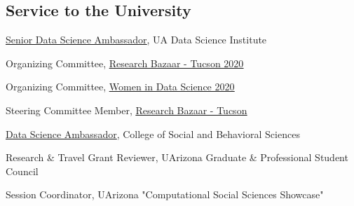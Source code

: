 \subsection*{Service to the University}

\href{https://datascience.arizona.edu/ambassadors}
{\underline{Senior Data Science Ambassador}}, UA Data Science Institute

Organizing Committee, 
\href{http://researchbazaar.arizona.edu/resbaz/resbazTucson2020/}
{\underline{Research Bazaar - Tucson 2020}} 

Organizing Committee, 
\href{https://datascience.arizona.edu/events/338-women-data-science-tucson-regional-event}
{\underline{Women in Data Science 2020}}

Steering Committee Member, 
\href{http://researchbazaar.arizona.edu/}
{\underline{Research Bazaar - Tucson}} 

\href{https://datascience.arizona.edu/ambassadors}
{\underline{Data Science Ambassador}}, College of Social and Behavioral Sciences

 Research \& Travel Grant Reviewer, UArizona Graduate \& Professional Student Council

 Session Coordinator, UArizona "Computational Social Sciences Showcase" 